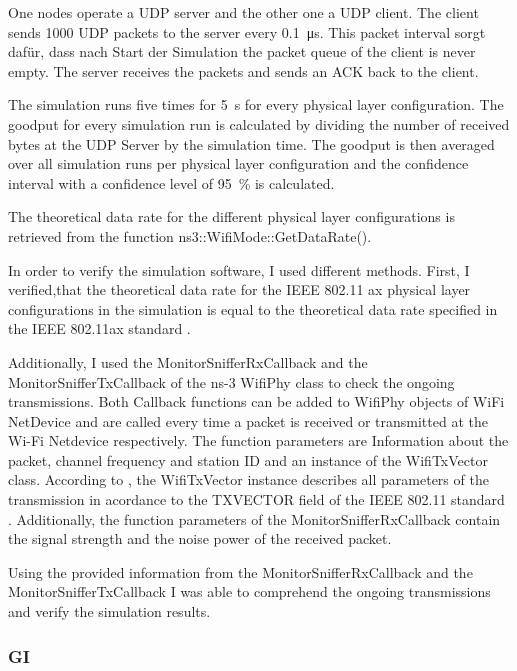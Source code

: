 One nodes operate a UDP server and the other one a UDP client. The client sends \SI{1000}{\byte} UDP packets to the server every \SI{0.1}{\micro\second}. This packet interval
sorgt dafür, dass nach Start der Simulation the packet queue of the client is never empty. The server receives the packets and sends an ACK back to the client.

The simulation runs five times for \SI{5}{\second} for every physical layer configuration.
The goodput for every simulation run is calculated by dividing the number of received bytes at the UDP Server by the simulation time.
The goodput is then averaged over all simulation runs per physical layer configuration and the confidence interval with a confidence level of
\SI{95}{\percent} is calculated.

The theoretical data rate for the different physical layer configurations is retrieved from the function ns3::WifiMode::GetDataRate().

In order to verify the simulation software, I used different methods. First, I verified,that the theoretical data rate for the IEEE 802.11 ax physical layer configurations in
the simulation is equal to the theoretical data rate specified in the IEEE 802.11ax standard \cite{noauthor_ieee_2021}.

Additionally, I used the MonitorSnifferRxCallback and the MonitorSnifferTxCallback of the ns-3 WifiPhy class to check the ongoing transmissions.
Both Callback functions can be added to WifiPhy objects of WiFi NetDevice and are called every time a packet is received or transmitted at the Wi-Fi Netdevice respectively.
The function parameters are Information about the packet, channel frequency and station ID and an instance of the WifiTxVector class. According to \cite{ClassReference}, the WifiTxVector instance describes all parameters of the transmission in
acordance to the TXVECTOR field of the IEEE 802.11 standard \cite{noauthor_ieee_2021}. Additionally, the function parameters of the MonitorSnifferRxCallback contain the signal strength and
the noise power of the received packet.

Using the provided information from the MonitorSnifferRxCallback and the MonitorSnifferTxCallback I was able to comprehend the ongoing transmissions and
verify the simulation results.
\subsubsection*{\acf{GI}}

